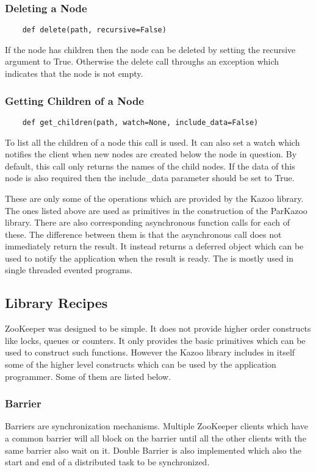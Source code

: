   \subsubsection{Deleting a Node}
  \begin{lstlisting}
    def delete(path, recursive=False)
  \end{lstlisting}
  If the node has children then the node can be deleted by setting the recursive argument to True. Otherwise the delete call throughs an exception which indicates that the node is not empty.
  
  \subsubsection{Getting Children of a Node}
  \begin{lstlisting}
    def get_children(path, watch=None, include_data=False)
  \end{lstlisting}
  To list all the children of a node this call is used. It can also set a watch which notifies the client when new nodes are created below the node in question. By default, this call only returns the names of the child nodes. If the data of this node is also required then the include\_data parameter should be set to True.
  
  These are only some of the operations which are provided by the Kazoo library. The ones listed above are used as primitives in the construction of the ParKazoo library. There are also corresponding asynchronous function calls for each of these. The difference between them is that the asynchronous call does not immediately return the result. It instead returns a deferred object which can be used to notify the application when the result is ready. The is mostly used in single threaded evented programs.
  
\subsection{Library Recipes}
  ZooKeeper was designed to be simple. It does not provide higher order constructs like locks, queues or counters. It only provides the basic primitives which can be used to construct such functions. However the Kazoo library includes in itself some of the higher level constructs which can be used by the application programmer. Some of them are listed below.
  \subsubsection{Barrier}
    Barriers are synchronization mechanisms. Multiple ZooKeeper clients which have a common barrier will all block on the barrier until all the other clients with the same barrier also wait on it. Double Barrier is also implemented which also the start and end of a distributed task to be synchronized.
